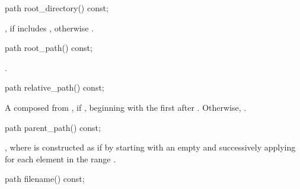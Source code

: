 \begin{itemdecl}
path root_directory() const;
\end{itemdecl}

\begin{itemdescr}
\pnum
\returns {}, if  includes , otherwise .
\end{itemdescr}

\begin{itemdecl}
path root_path() const;
\end{itemdecl}

\begin{itemdescr}
\pnum
\returns {}.
\end{itemdescr}

\begin{itemdecl}
path relative_path() const;
\end{itemdecl}

\begin{itemdescr}
\pnum
\returns A  composed from , if , beginning
with the first  after . Otherwise, .
\end{itemdescr}

\begin{itemdecl}
path parent_path() const;
\end{itemdecl}

\begin{itemdescr}
\pnum
\returns {},
where  is constructed as if by
  starting with an empty  and successively applying  for each element in the range
  .
\end{itemdescr}

\begin{itemdecl}
path filename() const;
\end{itemdecl}


